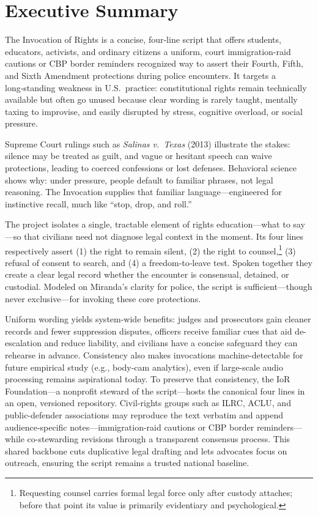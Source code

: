 \section{Executive Summary}

The Invocation of Rights is a concise, four‑line script that offers students, educators, activists, and ordinary citizens a uniform, court
immigration-raid cautions or CBP border reminders
recognized way to assert their Fourth, Fifth, and Sixth Amendment protections during police encounters. It targets a long‑standing weakness in U.S.\ practice: constitutional rights remain technically available but often go unused because clear wording is rarely taught, mentally taxing to improvise, and easily disrupted by stress, cognitive overload, or social pressure.

Supreme Court rulings such as \textit{Salinas v.\ Texas} (2013) illustrate the stakes: silence may be treated as guilt, and vague or hesitant speech can waive protections, leading to coerced confessions or lost defenses. Behavioral science shows why: under pressure, people default to familiar phrases, not legal reasoning. The Invocation supplies that familiar language—engineered for instinctive recall, much like ``stop, drop, and roll.''

The project isolates a single, tractable element of rights education—what to say—so that civilians need not diagnose legal context in the moment. Its four lines respectively assert (1) the right to remain silent, (2) the right to counsel,\footnote{Requesting counsel carries formal legal force only after custody attaches; before that point its value is primarily evidentiary and psychological.} (3) refusal of consent to search, and (4) a freedom‑to‑leave test. Spoken together they create a clear legal record whether the encounter is consensual, detained, or custodial. Modeled on Miranda’s clarity for police, the script is sufficient—though never exclusive—for invoking these core protections.

Uniform wording yields system-wide benefits: judges and prosecutors gain cleaner records and fewer suppression disputes, officers receive familiar cues that aid de-escalation and reduce liability, and civilians have a concise safeguard they can rehearse in advance. Consistency also makes invocations machine-detectable for future empirical study (e.g., body-cam analytics), even if large-scale audio processing remains aspirational today. To preserve that consistency, the IoR Foundation—a nonprofit steward of the script—hosts the canonical four lines in an open, versioned repository. Civil-rights groups such as ILRC, ACLU, and public-defender associations may reproduce the text verbatim and append audience-specific notes—immigration-raid cautions or CBP border reminders—while co-stewarding revisions through a transparent consensus process. This shared backbone cuts duplicative legal drafting and lets advocates focus on outreach, ensuring the script remains a trusted national baseline.

